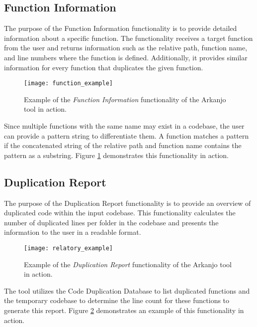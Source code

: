 \subsection{Function Information}
\label{subsec:functioncommand}

The purpose of the Function Information functionality is to provide detailed information about a specific function. The functionality receives a target function from the user and returns information such as the relative path, function name, and line numbers where the function is defined. Additionally, it provides similar information for every function that duplicates the given function.

\begin{figure}
\texttt{[image: function\_example]}
\caption{Example of the \textit{Function Information} functionality of the Arkanjo tool in action.}
\label{fig:function_ex}
\end{figure}

Since multiple functions with the same name may exist in a codebase, the user can provide a pattern string to differentiate them. A function matches a pattern if the concatenated string of the relative path and function name contains the pattern as a substring. Figure \ref{fig:function_ex} demonstrates this functionality in action.

\subsection{Duplication Report}

The purpose of the Duplication Report functionality is to provide an overview of duplicated code within the input codebase. This functionality calculates the number of duplicated lines per folder in the codebase and presents the information to the user in a readable format. 

\begin{figure}
\texttt{[image: relatory\_example]}
\caption{Example of the \textit{Duplication Report} functionality of the Arkanjo tool in action.}
\label{fig:relatory_ex}
\end{figure}

The tool utilizes the Code Duplication Database to list duplicated functions and the temporary codebase to determine the line count for these functions to generate this report. Figure \ref{fig:relatory_ex} demonstrates an example of this functionality in action.



